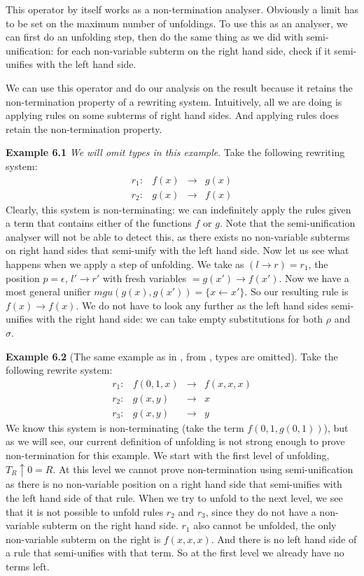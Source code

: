 This operator by itself works as a non-termination analyser. Obviously a limit has to be set on the maximum number of unfoldings. To use this as an analyser, we can first do an unfolding step, then do the same thing as we did with semi-unification: for each non-variable subterm on the right hand side, check if it semi-unifies with the left hand side. 

We can use this operator and do our analysis on the result because it retains the non-termination property of a rewriting system. Intuitively, all we are doing is applying rules on some subterms of right hand sides. And applying rules does retain the non-termination property. 

\textbf{Example 6.1} \textit{We will omit types in this example}. Take the following rewriting system: 
\[
\begin{array}{lrcl}
    r_1: & f(x) & \rightarrow & g(x) \\
    r_2: & g(x) & \rightarrow & f(x)
\end{array}
\]
Clearly, this system is non-terminating: we can indefinitely apply the rules given a term that contains either of the functions $f$ or $g$. Note that the semi-unification analyser will not be able to detect this, as there exists no non-variable subterms on right hand sides that semi-unify with the left hand side. Now let us see what happens when we apply a step of unfolding. We take as $(l \rightarrow r) = r_1$, the position $p = \epsilon$, $l' \rightarrow r'$ with fresh variables $ = g(x') \rightarrow f(x')$. Now we have a most general unifier $\textit{mgu}(g(x), g(x')) = \{ x \leftarrow x' \}$. So our resulting rule is $f(x) \rightarrow f(x)$. We do not have to look any further as the left hand sides semi-unifies with the right hand side: we can take empty substitutions for both $\rho$ and $\sigma$. 

\textbf{Example 6.2} (The same example as in \cite{Payet:Unfolding}, from \cite{TOYAMA1987141}, types are omitted). Take the following rewrite system: 
\[
\begin{array}{lrcl}
    r_1: & f(0, 1, x) & \rightarrow & f(x, x, x) \\
    r_2: & g(x, y) & \rightarrow & x \\
    r_3: & g(x, y) & \rightarrow & y
\end{array}
\]
We know this system is non-terminating (take the term $f(0, 1, g(0, 1))$), but as we will see, our current definition of unfolding is not strong enough to prove non-termination for this example. We start with the first level of unfolding, $T_R \uparrow 0 = R$. At this level we cannot prove non-termination using semi-unification as there is no non-variable position on a right hand side that semi-unifies with the left hand side of that rule. When we try to unfold to the next level, we see that it is not possible to unfold rules $r_2$ and $r_3$, since they do not have a non-variable subterm on the right hand side. $r_1$ also cannot be unfolded, the only non-variable subterm on the right is $f(x, x, x)$. And there is no left hand side of a rule that semi-unifies with that term. So at the first level we already have no terms left.  

